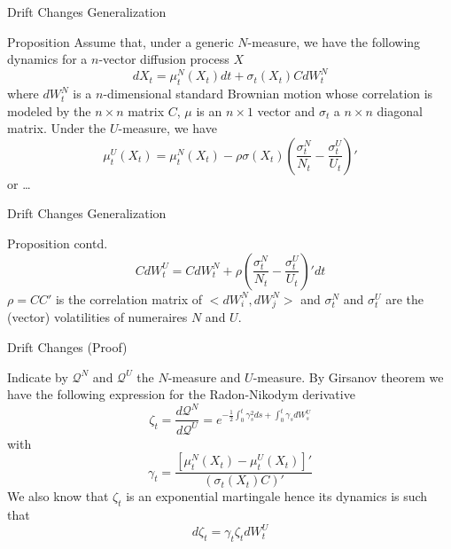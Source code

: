 \documentclass{beamer}
\begin{document}
\begin{frame}{Drift Changes Generalization}
  \begin{block}{Proposition}
    Assume that, under a generic $N$-measure, we have the following dynamics for a $n$-vector diffusion process $X$
    \begin{equation*}
      dX_t = \mu_t^N(X_t)dt + \sigma_t(X_t)CdW^N_t
    \end{equation*}
    where $dW^N_t$ is a $n$-dimensional standard Brownian motion whose correlation is modeled by the $n\times n$ matrix $C$, $\mu$ is an $n\times 1$ vector and $\sigma_t$ a $n\times n$ diagonal matrix. Under the $U$-measure, we have
    \begin{equation}
      \mu^U_t(X_t) = \mu^N_t(X_t) - \rho\sigma(X_t)\left(\frac{\sigma^N_t}{N_t}-\frac{\sigma^U_t}{U_t}\right)'
    \end{equation}
	or \ldots
	\end{block}
\end{frame}

\begin{frame}{Drift Changes Generalization}
	\begin{block}{Proposition contd.}
		\begin{equation}
			CdW^U_t = CdW^N_t + \rho\left(\frac{\sigma^N_t}{N_t}-\frac{\sigma^U_t}{U_t}\right)' dt
		\end{equation}
		$\rho=CC'$ is the correlation matrix of $<dW^N_i,dW^N_j>$ and $\sigma^N_t$ and $\sigma^U_t$ are the (vector) volatilities of numeraires $N$ and $U$. %
	\end{block}
\end{frame}

\begin{frame}{Drift Changes (Proof)}
  
  Indicate by $\mathcal{Q}^N$ and $\mathcal{Q}^U$ the $N$-measure and $U$-measure. By Girsanov theorem we have the following expression for the Radon-Nikodym derivative
  \begin{equation*}
    \zeta_t = \frac{d\mathcal{Q}^N}{d\mathcal{Q}^U} = e^{-\frac{1}{2}\int_0^t\gamma_s^2 ds + \int_0^t\gamma_s dW_s^U}
  \end{equation*}
  with 
  \begin{equation}
    \gamma_t=\frac{[\mu^N_t(X_t)-\mu_t^U(X_t)]'}{(\sigma_t(X_t)C)'}
    \label{eq:gamma_t}
  \end{equation}
	\pause
  We also know that $\zeta_t$ is an exponential martingale hence its dynamics is such that 
  \begin{equation}
    d\zeta_t=\gamma_t\zeta_tdW_t^U
    \label{eq:dzeta1}
  \end{equation}
\end{frame}
\end{document}
